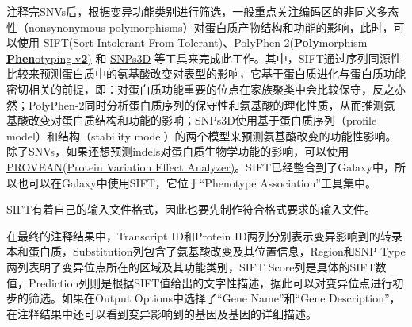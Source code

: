 \documentclass[11pt,a4paper,twoside]{book}
\begin{document}
注释完SNVs后，根据变异功能类别进行筛选，一般重点关注编码区的非同义多态性（nonsynonymous polymorphisms）对蛋白质产物结构和功能的影响，此时，可以使用 \href{http://sift.jcvi.org/}{SIFT(Sort Intolerant From Tolerant)}、\href{http://genetics.bwh.harvard.edu/pph2/index.shtml}{PolyPhen-2(\textbf{Poly}morphism \textbf{Phen}otyping v\textbf{2})} 和 \href{http://www.snps3d.org/}{SNPs3D} 等工具来完成此工作。其中，SIFT通过序列同源性比较来预测蛋白质中的氨基酸改变对表型的影响，它基于蛋白质进化与蛋白质功能密切相关的前提，即：对蛋白质功能重要的位点在家族聚类中会比较保守，反之亦然；PolyPhen-2同时分析蛋白质序列的保守性和氨基酸的理化性质，从而推测氨基酸改变对蛋白质结构和功能的影响；SNPs3D使用基于蛋白质序列（profile model）和结构（stability model）的两个模型来预测氨基酸改变的功能性影响。除了SNVs，如果还想预测indels对蛋白质生物学功能的影响，可以使用 \href{http://provean.jcvi.org/index.php}{PROVEAN(Protein Variation Effect Analyzer)}。SIFT已经整合到了Galaxy中，所以也可以在Galaxy中使用SIFT，它位于“Phenotype Association”工具集中。

SIFT有着自己的输入文件格式，因此也要先制作符合格式要求的输入文件。

在最终的注释结果中，Transcript ID和Protein ID两列分别表示变异影响到的转录本和蛋白质，Substitution列包含了氨基酸改变及其位置信息，Region和SNP Type两列表明了变异位点所在的区域及其功能类别，SIFT Score列是具体的SIFT数值，Prediction列则是根据SIFT值给出的文字性描述，据此可以对变异位点进行初步的筛选。如果在Output Options中选择了“Gene Name”和“Gene Description”，在注释结果中还可以看到变异影响到的基因及基因的详细描述。
\end{document}
